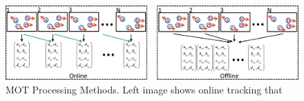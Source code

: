 \begin{figure}[htb]
  \centering
  \includegraphics[width=0.8\linewidth]{img/mot_processing_mod.jpg}
  \caption[MOT Processing Methods]{%
    MOT Processing Methods. Left image shows online tracking that 
  }
  \label{fig:mot_processing_mod}
\end{figure}
